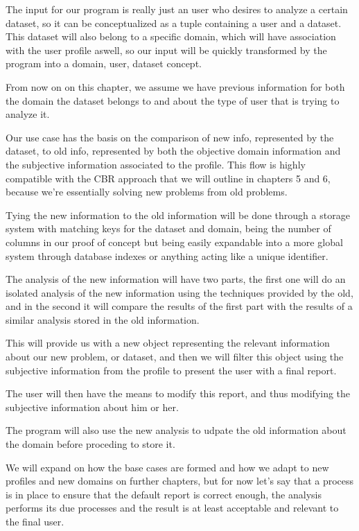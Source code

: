 The input for our program is really just an user who desires to analyze a certain dataset, so it can be conceptualized as a tuple containing a user and a dataset. This dataset will also belong to a specific domain, which will have association with the user profile aswell, so our input will be quickly transformed by the program into a domain, user, dataset concept.

From now on on this chapter, we assume we have previous information for both the domain the dataset belongs to and about the type of user that is trying to analyze it.

Our use case has the basis on the comparison of new info, represented by the dataset, to old info, represented by both the objective domain information and the subjective information associated to the profile. This flow is highly compatible with the CBR approach that we will outline in chapters 5 and 6, because we're essentially solving new problems from old problems.

Tying the new information to the old information will be done through a storage system with matching keys for the dataset and domain, being the number of columns in our proof of concept but being easily expandable into a more global system through database indexes or anything acting like a unique identifier.

The analysis of the new information will have two parts, the first one will do an isolated analysis of the new information using the techniques provided by the old, and in the second it will compare the results of the first part with the results of a similar analysis stored in the old information.

This will provide us with a new object representing the relevant information about our new problem, or dataset, and then we will filter this object using the subjective information from the profile to present the user with a final report.

The user will then have the means to modify this report, and thus modifying the subjective information about him or her.

The program will also use the new analysis to udpate the old information about the domain before proceding to store it.

We will expand on how the base cases are formed and how we adapt to new profiles and new domains on further chapters, but for now let's say that a process is in place to ensure that the default report is correct enough, the analysis performs its due processes and the result is at least acceptable and relevant to the final user.

